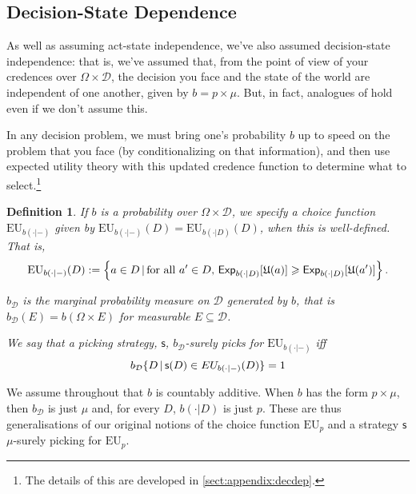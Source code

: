 \documentclass[a4paper]{article}
\newtheorem{definition}{Definition}
\newcommand\Exp{\mathsf{Exp}}
\newcommand\EU{\mathrm{EU}}
\newcommand\U{\mathfrak{U}} %
\newcommand{\D}{\mathcal{D}}
\newcommand{\Decs}{\mathcal{D}}
\renewcommand\S{\mathcal{S}}
\newcommand\s{\mathsf{s}}
\newcommand\SetDelimiter[1][]{
	\nonscript\,#1\vert \allowbreak \nonscript\,\mathopen{}}
\providecommand\given{\SetDelimiter}
\renewcommand{\geq}{\geqslant}
\newenvironment{CCM rewritten}
{\begingroup\color{blue}} %
{\endgroup}              %
\begin{document}
\subsection{Decision-State Dependence}\label{sect:decdep}

As well as assuming act-state independence, we've also assumed decision-state independence: that is, we've assumed that, from the point of view of your credences over $\Omega \times \D$, the decision you face and the state of the world are independent of one another, given by $b=p\times\mu$. But, in fact, analogues of  hold even if we don't assume this. 

In any decision problem, we must bring one's probability $b$ up to speed on the problem that you face (by conditionalizing on that information), and then use expected utility theory with this updated credence function to determine what to select.\footnote{The details of this are developed in \cref{sect:appendix:decdep}.}


\begin{definition}\label{def:cond}
	If $b$ is a probability over $\Omega\times \D$, we specify a choice function 
	$\EU_{b(\cdot|-)}$ given by $\EU_{b(\cdot|-)}(D)=\EU_{b(\cdot|D)}(D)$, when this is well-defined. That is, $$\EU_{b(\cdot|-)}(D):=\left \{a\in D\given \text{for all $a'\in D$, }\Exp_{b(\cdot|D)}[\U(a)]\geq \Exp_{b(\cdot|D)}[\U(a')]\right \}.$$%

$b_\Decs$ is the marginal probability measure on $\Decs$ generated by $b$, that is $b_\D(E)=b(\Omega\times E)$ for measurable $E\subseteq\Decs$.%

We say that %
a picking strategy, $\s$, \emph{$b_\Decs$-surely picks for $\EU_{b(\cdot|-)}$} iff \[b_\Decs\{D\given \s(D)\in EU_{b(\cdot|-)}(D)\}=1\]
\end{definition}
We assume throughout that $b$ is countably additive. When $b$ has the form $p\times\mu$, then $b_\Decs$ is just $\mu$ and, for every $D$, $b(\cdot|D)$ is just $p$. These are thus generalisations of our original notions of the choice function $\EU_p$ and a strategy $\s$ $\mu$-surely picking for $\EU_p$. 
\end{document}
